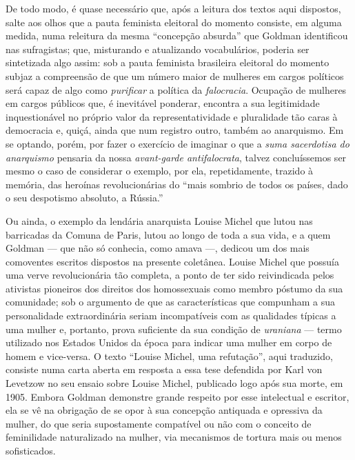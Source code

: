 De todo modo, é quase necessário que, após a leitura dos textos
aqui dispostos, salte aos olhos que a pauta feminista eleitoral do
momento consiste, em alguma medida, numa releitura da mesma ``concepção
absurda'' que Goldman identificou nas sufragistas; que, misturando e
atualizando vocabulários, poderia ser sintetizada algo assim: sob a
pauta feminista brasileira eleitoral do momento subjaz a compreensão de
que um número maior de mulheres em cargos políticos será capaz de algo
como \textit{purificar} a política da \textit{falocracia}. Ocupação de mulheres em
cargos públicos que, é inevitável ponderar, encontra a sua legitimidade
inquestionável no próprio valor da representatividade e pluralidade tão
caras à democracia e, quiçá, ainda que num registro outro, também ao
anarquismo. Em se optando, porém, por fazer o exercício de imaginar o
que a \textit{suma sacerdotisa do anarquismo} pensaria da nossa
\textit{avant-garde antifalocrata}, talvez concluíssemos ser mesmo o
caso de considerar o exemplo, por ela, repetidamente, trazido à memória,
das heroínas revolucionárias do ``mais sombrio de todos os países, dado
o seu despotismo absoluto, a Rússia.''

Ou ainda, o exemplo da lendária
anarquista Louise Michel que lutou nas barricadas da Comuna de Paris,
lutou ao longo de toda a sua vida, e a quem Goldman --- que não só
conhecia, como amava ---, dedicou um dos mais comoventes escritos
dispostos na presente coletânea. Louise Michel que possuía uma verve
revolucionária tão completa, a ponto de ter sido reivindicada pelos
ativistas pioneiros dos direitos dos homossexuais como membro póstumo da
sua comunidade; sob o argumento de que as características que compunham
a sua personalidade extraordinária seriam incompatíveis com as
qualidades típicas a uma mulher e, portanto, prova suficiente da sua
condição de \textit{uraniana} --- termo utilizado nos Estados Unidos da época
para indicar uma mulher em corpo de homem e vice-versa. O texto ``Louise
Michel, uma refutação'', aqui traduzido, consiste numa carta aberta em
resposta a essa tese defendida por Karl von Levetzow no seu ensaio sobre
Louise Michel, publicado logo após sua morte, em 1905. Embora Goldman
demonstre grande respeito por esse intelectual e escritor, ela se vê na
obrigação de se opor à sua concepção antiquada e opressiva da mulher, do
que seria supostamente compatível ou não com o conceito de
feminilidade naturalizado na mulher, via mecanismos de tortura mais
ou menos sofisticados.

